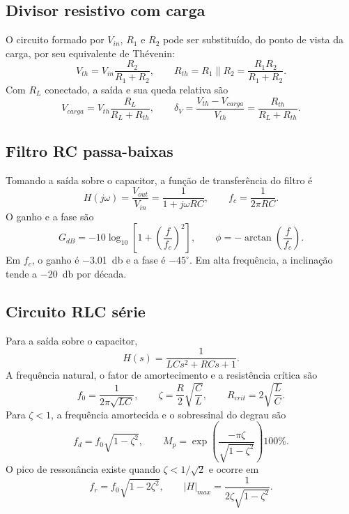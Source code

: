 \documentclass[11pt,a4paper]{article}
\begin{document}
\subsection{Divisor resistivo com carga}

O circuito formado por $V_{in}$, $R_1$ e $R_2$ pode ser substituído, do ponto de vista da carga, por
seu equivalente de Thévenin:
\begin{equation}
V_{th}=V_{in}\frac{R_2}{R_1+R_2}, \qquad
R_{th}=R_1\parallel R_2=\frac{R_1R_2}{R_1+R_2}.
\label{eq:thevenin}
\end{equation}
Com $R_L$ conectado, a saída e sua queda relativa são
\begin{equation}
V_{carga}=V_{th}\frac{R_L}{R_L+R_{th}}, \qquad
\delta_V=\frac{V_{th}-V_{carga}}{V_{th}}=\frac{R_{th}}{R_L+R_{th}}.
\label{eq:carga}
\end{equation}

\subsection{Filtro RC passa-baixas}

Tomando a saída sobre o capacitor, a função de transferência do filtro é
\begin{equation}
H(j\omega)=\frac{V_{out}}{V_{in}}=\frac{1}{1+j\omega RC}, \qquad
f_c=\frac{1}{2\pi RC}.
\label{eq:rc}
\end{equation}
O ganho e a fase são
\begin{equation}
G_{dB}=-10\log_{10}\left[1+\left(\frac{f}{f_c}\right)^2\right], \qquad
\phi=-\arctan\left(\frac{f}{f_c}\right).
\label{eq:bode-rc}
\end{equation}
Em $f_c$, o ganho é \SI{-3,01}{\decibel} e a fase é $-45^\circ$. Em alta frequência, a
inclinação tende a \SI{-20}{\decibel} por década.

\subsection{Circuito RLC série}

Para a saída sobre o capacitor,
\begin{equation}
H(s)=\frac{1}{LCs^2+RCs+1}.
\end{equation}
A frequência natural, o fator de amortecimento e a resistência crítica são
\begin{equation}
f_0=\frac{1}{2\pi\sqrt{LC}}, \qquad
\zeta=\frac{R}{2}\sqrt{\frac{C}{L}}, \qquad
R_{crit}=2\sqrt{\frac{L}{C}}.
\label{eq:rlc}
\end{equation}
Para $\zeta<1$, a frequência amortecida e o sobressinal do degrau são
\begin{equation}
f_d=f_0\sqrt{1-\zeta^2}, \qquad
M_p=\exp\left(\frac{-\pi\zeta}{\sqrt{1-\zeta^2}}\right)100\%.
\label{eq:degrau}
\end{equation}
O pico de ressonância existe quando $\zeta<1/\sqrt{2}$ e ocorre em
\begin{equation}
f_r=f_0\sqrt{1-2\zeta^2}, \qquad
|H|_{max}=\frac{1}{2\zeta\sqrt{1-\zeta^2}}.
\label{eq:ressonancia}
\end{equation}
\end{document}
